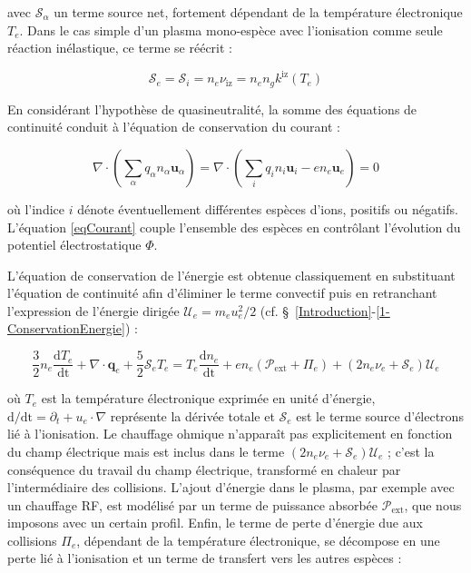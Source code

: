 \begin{refsection}
avec $\mathcal{S}_\alpha$ un terme source net, fortement dépendant de la
température électronique $T_e$. Dans le cas simple d'un plasma mono-espèce avec
l'ionisation comme seule réaction inélastique, ce terme se réécrit :

\begin{equation}
\mathcal S_e=\mathcal
S_i=n_e\nu_\text{iz}=n_en_gk^\text{iz}(T_e) 
\end{equation}

En considérant l'hypothèse de quasineutralité, la
somme des équations de continuité conduit à l'équation de conservation du courant :

\begin{equation}
\label{eqCourant}
\nabla\cdot(\sum_\alpha q_\alpha n_\alpha\mathbf
u_\alpha)=\nabla\cdot(\sum_iq_in_i\mathbf{u}_i-en_e\mathbf{u}_e)=0
\end{equation}

où l'indice $i$ dénote éventuellement différentes espèces d'ions, positifs ou
négatifs.
L'équation \eqref{eqCourant} couple l'ensemble des espèces en contrôlant
l'évolution du potentiel électrostatique $\Phi$.

L'équation de conservation de l'énergie est obtenue classiquement en substituant
l'équation de continuité afin d'éliminer le terme convectif puis en retranchant
l'expression de l'énergie dirigée $\mathcal{U}_e=m_eu_e^2/2$ (cf.
\S~\ref{Introduction}-\ref{1-ConservationEnergie}) :

\begin{equation}
\label{3-eqTemperature}
\frac{3}{2}n_e\frac{\text{d}T_e}{\text{dt}}+\nabla\cdot\mathbf
q_e + \frac{5}{2}\mathcal{S}_e T_e = T_e\frac{\text{d}n_e}{\text{dt}}+ 
en_e\left(\mathcal{P}_\text{ext}+\Pi_e\right)+(2n_e\nu_e+\mathcal{S}_e)\mathcal{U}_e
\end{equation}

où $T_e$ est la température électronique exprimée en unité d'énergie,
$\text{d/dt}=\partial_t+u_e\cdot\nabla$ représente la dérivée totale et
$\mathcal{S}_e$ est le terme source d'électrons lié à l'ionisation. 
Le chauffage ohmique n'apparaît pas explicitement en fonction du champ
électrique mais est inclus dans le terme
$(2n_e\nu_e+\mathcal{S}_e)\mathcal{U}_e$ ; c'est la
conséquence du travail du champ électrique, transformé en chaleur par
l'intermédiaire des collisions. L'ajout d'énergie dans le plasma, par exemple
avec un chauffage RF, est modélisé par un terme
de puissance absorbée $\mathcal{P}_\text{ext}$, que nous imposons avec un
certain profil. Enfin, le terme de perte d'énergie due aux collisions $\Pi_e$,
dépendant de la température électronique, se décompose en une perte lié à
l'ionisation et un terme de transfert vers les autres espèces :


\end{refsection}
